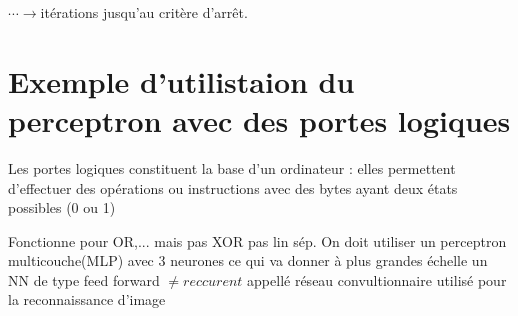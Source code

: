\documentclass[openany,14pt,fleqn]{book} %
\begin{document}
$\cdots \rightarrow$itérations jusqu'au critère d'arrêt.
\section{Exemple d'utilistaion du perceptron avec des portes logiques}
Les portes logiques constituent la base d'un ordinateur : elles permettent d'effectuer des opérations ou instructions avec des bytes ayant deux états possibles (0 ou 1)















Fonctionne pour OR,... mais pas XOR pas lin sép. On doit utiliser un perceptron multicouche(MLP) avec 3 neurones ce qui va donner à plus grandes échelle un NN de type feed forward $\neq reccurent$ appellé réseau convultionnaire utilisé pour la reconnaissance d'image\\
\end{document}
